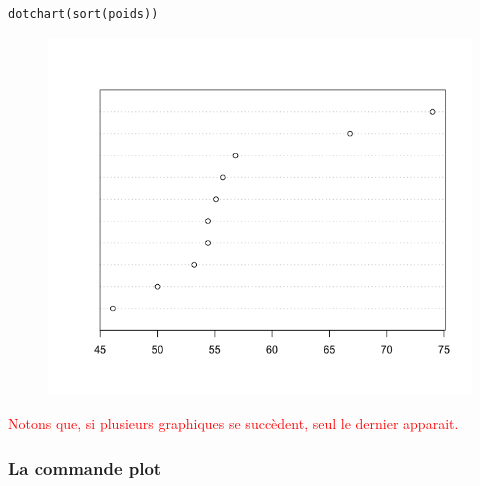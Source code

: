 \begin{lstlisting}[language=html]
dotchart(sort(poids))
\end{lstlisting}
\begin{figure}[H]\begin{center}\includegraphics[scale=0.4]{ilu/gra7.png}\end{center}\end{figure}
\textcolor{red}{Notons que, si plusieurs graphiques se succèdent, seul le dernier apparait.}
\subsubsection{La commande plot}
